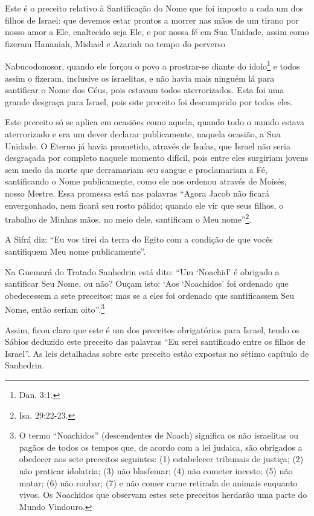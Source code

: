 Este é o preceito relativo à Santificação do Nome que foi imposto a cada
um dos filhos de Israel: que devemos estar prontos a morrer nas mãos de
um tirano por nosso amor a Ele, enaltecido seja Ele, e por nossa fé em
Sua Unidade, assim como fizeram Hananiah, Mishael e Azariah no tempo do
perverso

Nabucodonosor, quando ele forçou o povo a prostrar-se diante do
ídolo\footnote{Dan. 3:1.} e todos assim o fizeram, inclusive os
israelitas, e não havia mais ninguém lá para santificar o Nome dos
Céus, pois estavam todos aterrorizados. Esta foi uma grande desgraça
para Israel, pois este preceito foi descumprido por todos eles.

Este preceito só se aplica em ocasiões como aquela, quando todo
o mundo estava aterrorizado e era um dever declarar publicamente,
naquela ocasião, a Sua Unidade. O Eterno já havia prometido, através de
Isaías, que Israel não seria desgraçada por completo naquele momento
difícil, pois entre eles surgiriam jovens sem medo da morte que
derramariam seu sangue e proclamariam a Fé, santificando o Nome
publicamente, como ele nos ordenou através
de Moisés, nosso Mestre. Essa promessa está nas palavras ``Agora Jacob
não ficará envergonhado, nem ficará seu rosto pálido; quando ele vir que seus
filhos, o
trabalho de Minhas mãos, no meio dele, santificam o Meu
nome''\footnote{Isa. 29:22-23.}.

A Sifrá diz: ``Eu vos tirei da terra do Egito com a condição de que
vocês santifiquem Meu nome publicamente''.

Na Guemará do Tratado Sanhedrin está dito: ``Um `Noachid' é obrigado a
santificar Seu Nome, ou não? Ouçam isto: `Aos `Noachidos' foi ordenado que obedecessem a sete preceitos; mas se a eles foi ordenado que
santificassem Seu Nome, então seriam oito''.\footnote{O termo ``Noachidos'' (descendentes de Noach) significa os não
israelitas ou pagãos de todos os tempos que, de acordo com a lei
judaica, são obrigados a obedecer aos sete preceitos seguintes:
(1) estabelecer tribunais de justiça; (2) não praticar idolatria;
(3) não blasfemar; (4) não cometer incesto; (5) não matar;
(6) não roubar; (7) e não comer carne retirada de animais enquanto vivos. Os Noachidos que observam estes sete preceitos herdarão uma parte do Mundo Vindouro.}

Assim, ficou claro que este é um dos preceitos obrigatórios para
Israel, tendo os Sábios deduzido este preceito das palavras ``Eu serei
santificado entre os filhos de Israel''. As leis detalhadas sobre este
preceito estão expostas no sétimo capítulo de Sanhedrin.

